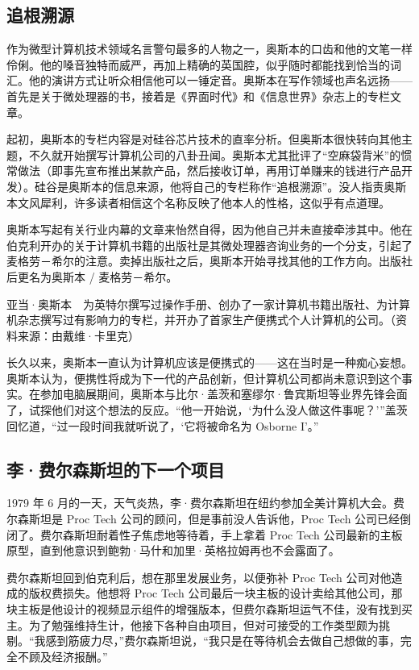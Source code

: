 \documentclass[12pt,UTF8]{ctexbook}
\begin{document}
\subsection{追根溯源}


作为微型计算机技术领域名言警句最多的人物之一，奥斯本的口齿和他的文笔一样伶俐。他的嗓音独特而威严，再加上精确的英国腔，似乎随时都能找到恰当的词汇。他的演讲方式让听众相信他可以一锤定音。奥斯本在写作领域也声名远扬——首先是关于微处理器的书，接着是《界面时代》和《信息世界》杂志上的专栏文章。

起初，奥斯本的专栏内容是对硅谷芯片技术的直率分析。但奥斯本很快转向其他主题，不久就开始撰写计算机公司的八卦丑闻。奥斯本尤其批评了“空麻袋背米”的惯常做法（即事先宣布推出某款产品，然后接收订单，再用订单赚来的钱进行产品开发）。硅谷是奥斯本的信息来源，他将自己的专栏称作“追根溯源”。没人指责奥斯本文风犀利，许多读者相信这个名称反映了他本人的性格，这似乎有点道理。

奥斯本写起有关行业内幕的文章来怡然自得，因为他自己并未直接牵涉其中。他在伯克利开办的关于计算机书籍的出版社是其微处理器咨询业务的一个分支，引起了麦格劳－希尔的注意。卖掉出版社之后，奥斯本开始寻找其他的工作方向。出版社后更名为奥斯本 / 麦格劳－希尔。



亚当·奥斯本　为英特尔撰写过操作手册、创办了一家计算机书籍出版社、为计算机杂志撰写过有影响力的专栏，并开办了首家生产便携式个人计算机的公司。（资料来源：由戴维·卡里克）

长久以来，奥斯本一直认为计算机应该是便携式的——这在当时是一种痴心妄想。奥斯本认为，便携性将成为下一代的产品创新，但计算机公司都尚未意识到这个事实。在参加电脑展期间，奥斯本与比尔·盖茨和塞缪尔·鲁宾斯坦等业界先锋会面了，试探他们对这个想法的反应。“他一开始说，‘为什么没人做这件事呢？’”盖茨回忆道，“过一段时间我就听说了，‘它将被命名为 Osborne I’。”





\subsection{李·费尔森斯坦的下一个项目}


1979 年 6 月的一天，天气炎热，李·费尔森斯坦在纽约参加全美计算机大会。费尔森斯坦是 Proc Tech 公司的顾问，但是事前没人告诉他，Proc Tech 公司已经倒闭了。费尔森斯坦耐着性子焦虑地等待着，手上拿着 Proc Tech 公司最新的主板原型，直到他意识到鲍勃·马什和加里·英格拉姆再也不会露面了。

费尔森斯坦回到伯克利后，想在那里发展业务，以便弥补 Proc Tech 公司对他造成的版权费损失。他想将 Proc Tech 公司最后一块主板的设计卖给其他公司，那块主板是他设计的视频显示组件的增强版本，但费尔森斯坦运气不佳，没有找到买主。为了勉强维持生计，他接下各种自由项目，但对可接受的工作类型颇为挑剔。“我感到筋疲力尽，”费尔森斯坦说，“我只是在等待机会去做自己想做的事，完全不顾及经济报酬。”
\end{document}
